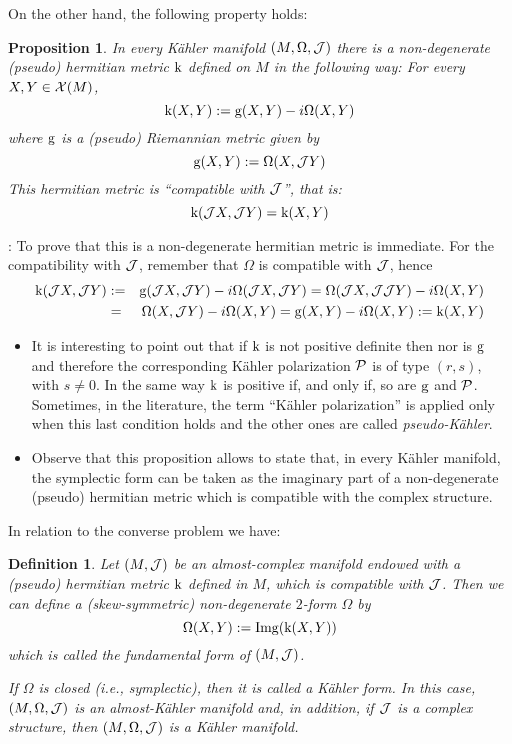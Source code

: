 \documentclass[12pt]{article}
\theoremstyle{plain}
\newtheorem{prop}{Proposition}
\newtheorem{definition}{Definition}
\def\beann{\begin{eqnarray*}}
\def\eeann{\end{eqnarray*}}
\def\qed{\ifvmode\removelastskip\fi
{\unskip\nobreak\hfil\penalty50\hbox{}\nobreak\hfil
\hbox{\vrule height1.2ex width1.2ex}\parfillskip=0pt
\finalhyphendemerits=0 \par\smallskip}}
\def\P{{\cal P}}
\begin{document}
On the other hand, the following property holds:

\begin{prop}
In every K\"ahler manifold $(M,\Omega ,{\cal J})$
there is a non-degenerate (pseudo) hermitian metric ${\rm k}$
defined on $M$ in the following way:
For every $X,Y \in {\cal X}(M)$,
$$
{\rm k} (X,Y) := {\rm g}(X,Y) - i\Omega (X,Y)
$$
where ${\rm g}$ is a (pseudo) Riemannian metric given by
$$
{\rm g}(X,Y) := \Omega (X,{\cal J}Y)
$$
This hermitian metric is ``compatible with ${\cal J}$'',
that is:
$$
{\rm k} ({\cal J}X,{\cal J}Y) = {\rm k} (X,Y)
$$
\end{prop}
: 
To prove that this is a non-degenerate hermitian metric is immediate.
For the compatibility with ${\cal J}$, remember that
$\Omega$ is compatible with ${\cal J}$, hence
\beann
{\rm k} ({\cal J}X,{\cal J}Y)&:=&
{\rm g}({\cal J}X,{\cal J}Y) - i\Omega ({\cal J}X,{\cal J}Y)
=\Omega ({\cal J}X,{\cal J}{\cal J}Y) - i\Omega (X,Y)
\\ &=&
\Omega (X,{\cal J}Y) - i\Omega (X,Y)
={\rm g}(X,Y) - i\Omega (X,Y) := {\rm k} (X,Y)
\eeann
\qed
{}
\begin{itemize}
\item
It is interesting to point out that if ${\rm k}$ is not positive
definite
then nor is $\rm g$ and therefore the corresponding K\"ahler
polarization $\P$
is of type $(r,s)$, with $s\not=0$.
In the same way ${\rm k}$ is positive if, and only if, so are ${\rm g}$
and $\P$.
Sometimes, in the literature, the term ``K\"ahler polarization''
is applied only when this last condition holds and the
other ones are called {\it pseudo-K\"ahler}.
\item
Observe that this proposition allows to state that,
in every K\"ahler manifold,
the symplectic form can be taken as the imaginary part of a
non-degenerate (pseudo) hermitian metric
which is compatible with the complex structure.
\end{itemize}

In relation to the converse problem we have:

\begin{definition}
Let $(M,{\cal J})$ be an almost-complex manifold endowed
with a (pseudo) hermitian metric ${\rm k}$ defined in $M$,
which is compatible with ${\cal J}$.
Then we can define a (skew-symmetric) non-degenerate
$2$-form $\Omega$ by
$$
\Omega (X,Y) :={\rm Img} ({\rm k} (X,Y))
$$
which is called the
{\rm fundamental form} of $(M,{\cal J})$.

If $\Omega$ is closed (i.e., symplectic),
then it is called a {\rm K\"ahler form}.
In this case, $(M,\Omega ,{\cal J})$ is an almost-K\"ahler manifold
and, in addition, if ${\cal J}$ is a complex structure,
then $(M,\Omega ,{\cal J})$ is a K\"ahler manifold.
\end{definition}
\end{document}
